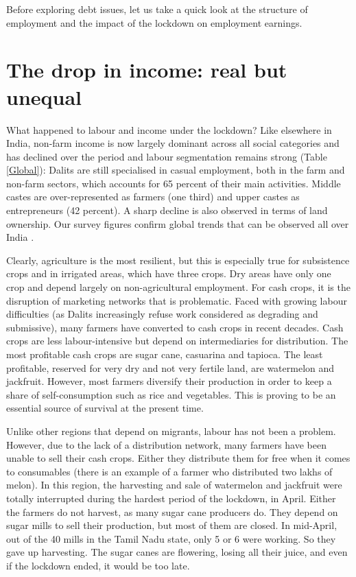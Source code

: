 \documentclass[a4paper, 11pt, onecolumn]{article}
\begin{document}
Before exploring debt issues, let us take a quick look at the structure of employment and the impact of the lockdown on employment earnings.

\section{The drop in income: real but unequal}
\label{section:income}

What happened to labour and income under the lockdown? Like elsewhere in India, non-farm income is now largely dominant across all social categories and has declined over the period and labour segmentation remains strong (Table \ref{Global}): Dalits are still specialised in casual  employment, both in the farm and non-farm sectors, which accounts for 65 percent of their main activities. Middle castes are over-represented as farmers (one third) and upper castes as entrepreneurs (42 percent). A sharp decline is also observed in terms of land ownership. Our survey figures confirm global trends that can be observed all over India \citep{Lerche2009, Himanshu2011, Landy2018}. 



Clearly, agriculture is the most resilient, but this is especially true for subsistence crops and in irrigated areas, which have three crops.
Dry areas have only one crop and depend largely on non-agricultural employment. For cash crops, it is the disruption of marketing networks that is problematic. Faced with growing labour difficulties (as Dalits increasingly refuse work considered as degrading and submissive), many farmers have converted to cash crops in recent decades. Cash crops are less labour-intensive but depend on intermediaries for distribution. The most profitable cash crops are sugar cane, casuarina and tapioca. The least profitable, reserved for very dry and not very fertile land, are watermelon and jackfruit. However, most farmers diversify their production in order to keep a share of self-consumption such as rice and vegetables. This is proving to be an essential source of survival at the present time.

Unlike other regions that depend on migrants, labour has not been a problem. However, due to the lack of a distribution network, many farmers have been unable to sell their cash crops. Either they distribute them for free when it comes to consumables (there is an example of a farmer who distributed two lakhs of melon). In this region, the harvesting and sale of watermelon and jackfruit were totally interrupted during the hardest period of the lockdown, in April. Either the farmers do not harvest, as many sugar cane producers do. They depend on sugar mills to sell their production, but most of them are closed. In mid-April, out of the 40 mills in the Tamil Nadu state, only 5 or 6 were working. So they gave up harvesting. The sugar canes are flowering, losing all their juice, and even if the lockdown ended, it would be too late. 
\end{document}
